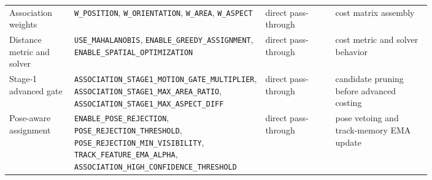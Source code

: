 \documentclass[11pt]{article}
\newcommand{\runtimekey}[1]{\texttt{#1}}
\begin{document}
\begin{longtable}{L{0.16\linewidth} L{0.21\linewidth} L{0.18\linewidth} L{0.25\linewidth}}
Association weights & \runtimekey{W\_POSITION}, \runtimekey{W\_ORIENTATION}, \runtimekey{W\_AREA}, \runtimekey{W\_ASPECT} & direct pass-through & cost matrix assembly \\
Distance metric and solver & \runtimekey{USE\_MAHALANOBIS}, \runtimekey{ENABLE\_GREEDY\_ASSIGNMENT}, \runtimekey{ENABLE\_SPATIAL\_OPTIMIZATION} & direct pass-through & cost metric and solver behavior \\
Stage-1 advanced gate & \runtimekey{ASSOCIATION\_STAGE1\_MOTION\_GATE\_MULTIPLIER}, \runtimekey{ASSOCIATION\_STAGE1\_MAX\_AREA\_RATIO}, \runtimekey{ASSOCIATION\_STAGE1\_MAX\_ASPECT\_DIFF} & direct pass-through & candidate pruning before advanced costing \\
Pose-aware assignment & \runtimekey{ENABLE\_POSE\_REJECTION}, \runtimekey{POSE\_REJECTION\_THRESHOLD}, \runtimekey{POSE\_REJECTION\_MIN\_VISIBILITY}, \runtimekey{TRACK\_FEATURE\_EMA\_ALPHA}, \runtimekey{ASSOCIATION\_HIGH\_CONFIDENCE\_THRESHOLD} & direct pass-through & pose vetoing and track-memory EMA update \\
\bottomrule
\end{longtable}
\end{document}
